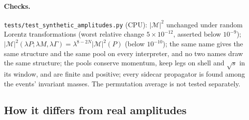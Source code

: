 \documentclass[11pt]{article}
\newcommand{\code}[1]{\texttt{#1}}
\begin{document}
\paragraph{Checks.} \code{tests/test\_synthetic\_amplitudes.py} (CPU): $|\mathcal M|^2$ unchanged under random Lorentz
transformations (worst relative change $5\times10^{-12}$, asserted below $10^{-9}$);
$|\mathcal M|^2(\lambda P;\lambda M,\lambda\Gamma)=\lambda^{8-2N}|\mathcal M|^2(P)$ (below $10^{-10}$); the same name
gives the same structure and the same pool on every interpreter, and no two names draw the same structure; the pools
conserve momentum, keep legs on shell and $\sqrt s$ in its window, and are finite and positive; every sidecar propagator
is found among the events' invariant masses. The permutation average is not tested separately.

\subsection{How it differs from real amplitudes}
\end{document}
